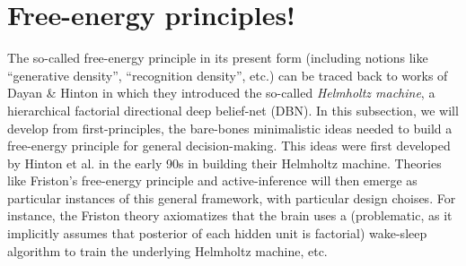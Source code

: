 \documentclass[10pt,letterpaper]{article}
\begin{document}
\section{Free-energy principles!}
The so-called free-energy principle in its present form (including notions like ``generative density'', ``recognition density'', etc.) can be traced back to works of Dayan \& Hinton \citep{dayan1995helmholtz} in which they introduced the so-called \textit{Helmholtz machine}, a hierarchical factorial directional deep belief-net (DBN).
In this subsection, we will develop from first-principles, the bare-bones minimalistic ideas needed to build a free-energy principle for general decision-making. This ideas were first developed by Hinton et al. in the early 90s in building their Helmholtz machine. Theories like Friston's free-energy principle and active-inference will then emerge as particular instances of this general framework, with particular design choises. For instance, the Friston theory axiomatizes that the brain uses a (problematic, as it implicitly assumes that posterior of each hidden unit is factorial) wake-sleep algorithm to train the underlying Helmholtz machine, etc.

\end{document}

